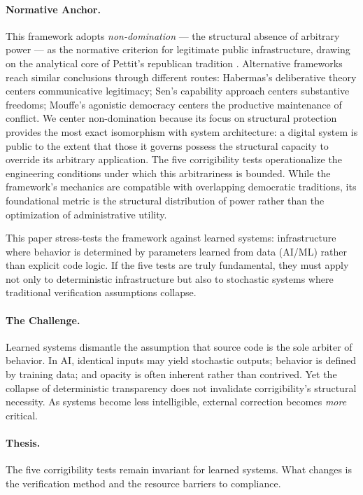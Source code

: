 \documentclass{article}
\theoremstyle{definition}
\begin{document}
\paragraph{Normative Anchor.} This framework adopts \textit{non-domination} --- the structural absence of arbitrary power --- as the normative criterion for legitimate public infrastructure, drawing on the analytical core of Pettit's republican tradition \citep{pettit1997}. Alternative frameworks reach similar conclusions through different routes: Habermas's deliberative theory \citep{habermas1996} centers communicative legitimacy; Sen's capability approach \citep{sen1999} centers substantive freedoms; Mouffe's agonistic democracy \citep{mouffe2000} centers the productive maintenance of conflict. We center non-domination because its focus on structural protection provides the most exact isomorphism with system architecture: a digital system is public to the extent that those it governs possess the structural capacity to override its arbitrary application. The five corrigibility tests operationalize the engineering conditions under which this arbitrariness is bounded. While the framework's mechanics are compatible with overlapping democratic traditions, its foundational metric is the structural distribution of power rather than the optimization of administrative utility.

This paper stress-tests the framework against learned systems: infrastructure where behavior is determined by parameters learned from data (AI/ML) rather than explicit code logic. If the five tests are truly fundamental, they must apply not only to deterministic infrastructure but also to stochastic systems where traditional verification assumptions collapse.

\paragraph{The Challenge.} Learned systems dismantle the assumption that source code is the sole arbiter of behavior. In AI, identical inputs may yield stochastic outputs; behavior is defined by training data; and opacity is often inherent rather than contrived. Yet the collapse of deterministic transparency does not invalidate corrigibility's structural necessity. As systems become less intelligible, external correction becomes \textit{more} critical.

\paragraph{Thesis.} The five corrigibility tests remain invariant for learned systems. What changes is the verification method and the resource barriers to compliance.
\end{document}
